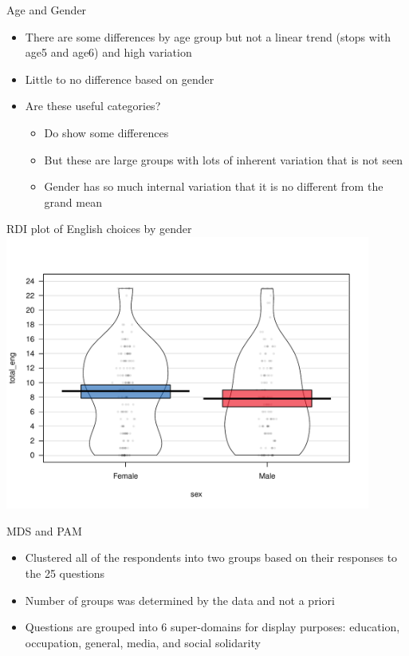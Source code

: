 \documentclass[10pt]{beamer}
\begin{document}
\begin{frame}{Age and Gender}
\begin{itemize}
\item There are some differences by age group but not a linear trend (stops with age5 and age6) and high variation
\item Little to no difference based on gender
\item Are these useful categories? 
\begin{itemize}
\item Do show some differences
\item But these are large groups with lots of inherent variation that is not seen
\item Gender has so much internal variation that it is no different from the grand mean
\end{itemize}
\end{itemize}
\end{frame}

\begin{frame}{RDI plot of English choices by gender}
\includegraphics[width=0.9\textwidth]{figures/engHDIgender.pdf}
\end{frame}



\begin{frame}{MDS and PAM}
\begin{itemize}
\item Clustered all of the respondents into two groups based on their responses to the 25 questions
\item Number of groups was determined by the data and not a priori
\item Questions are grouped into 6 super-domains for display purposes: education, occupation, general, media, and social solidarity
\end{itemize}
\end{frame}
\end{document}
